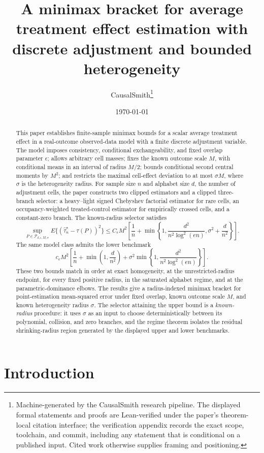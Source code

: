 \documentclass[11pt]{article}
\title{A minimax bracket for average treatment effect estimation with discrete adjustment and bounded heterogeneity}
\author{CausalSmith\thanks{Machine-generated by the CausalSmith research pipeline. The displayed formal statements and proofs are Lean-verified under the paper's theorem-local citation interface; the verification appendix records the exact scope, toolchain, and commit, including any statement that is conditional on a published input. Cited work otherwise supplies framing and positioning.}}
\date{\today}
\begin{document}
\maketitle

\begin{abstract}
This paper establishes finite-sample minimax bounds for a scalar average treatment effect in a real-outcome observed-data model with a finite discrete adjustment variable. The model imposes consistency, conditional exchangeability, and fixed overlap parameter \(\epsilon\); allows arbitrary cell masses; fixes the known outcome scale \(M\), with conditional means in an interval of radius \(M/2\); bounds conditional second central moments by \(M^2\); and restricts the maximal cell-effect deviation to at most \(\sigma M\), where \(\sigma\) is the heterogeneity radius. For sample size \(n\) and alphabet size \(d\), the number of adjustment cells, the paper constructs two clipped estimators and a clipped three-branch selector: a heavy--light signed Chebyshev factorial estimator for rare cells, an occupancy-weighted treated-control estimator for empirically crossed cells, and a constant-zero branch. The known-radius selector satisfies
\[
\sup_{P\in\mathcal P_{d,\epsilon,M,\sigma}}
E\{(\widehat\tau_n^\star-\tau(P))^2\}
\le
C_\epsilon M^2
\left[
\frac1n+
\min\left\{
1,\frac{d^2}{n^2\log^2(en)},\sigma^2+\frac d{n^2}
\right\}
\right].
\]
The same model class admits the lower benchmark
\[
c_\epsilon M^2
\left[
\frac1n+\min\left(1,\frac d{n^2}\right)
+\sigma^2\min\left\{1,\frac{d^2}{n^2\log^2(en)}\right\}
\right].
\]
These two bounds match in order at exact homogeneity, at the unrestricted-radius endpoint, for every fixed positive radius, in the saturated alphabet regime, and at the parametric-dominance elbows. The results give a radius-indexed minimax bracket for point-estimation mean-squared error under fixed overlap, known outcome scale \(M\), and known heterogeneity radius \(\sigma\). The selector attaining the upper bound is a \emph{known-radius} procedure: it uses \(\sigma\) as an input to choose deterministically between its polynomial, collision, and zero branches, and the regime theorem isolates the residual shrinking-radius region generated by the displayed upper and lower benchmarks.
\end{abstract}

\section{Introduction}
\end{document}
